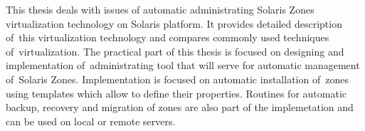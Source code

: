 This thesis deals with issues of automatic administrating Solaris Zones virtualization technology on Solaris platform.
It provides detailed description of~this virtualization technology and compares commonly used techniques of~virtualization.
The practical part of this thesis is focused on designing and implementation of~administrating tool that will serve for automatic
management of~Solaris Zones. Implementation is focused on automatic installation of~zones using templates which allow to define
their properties. Routines for automatic backup, recovery and migration of zones are also part of the implemetation and can be
used on local or remote servers.
